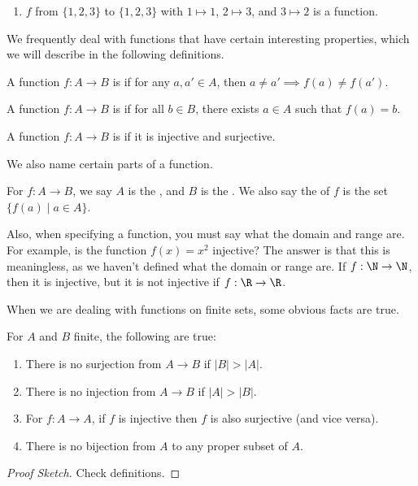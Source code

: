 \begin{example}
\begin{enumerate}[label=(\roman*)]
\begin{center}
\begin{tikzpicture}[x=0.75pt,y=0.75pt,yscale=-1,xscale=1]
\end{tikzpicture}

		\end{center}
		is a function.
	
	\item $f$ from $\{1, 2, 3\}$ to $\{1, 2, 3\}$ with $1 \mapsto 1$, $2 \mapsto 3$, and $3 \mapsto 2$ is a function.
\end{enumerate}
\end{example}

We frequently deal with functions that have certain interesting properties, which we will describe in the following definitions.

\begin{definition}[Injectivity]
	A function $f: A \rightarrow B$ is  if for any $a, a' \in A$, then $a \neq a' \implies f(a) \neq f(a')$.
\end{definition}
\begin{definition}[Surjectivity]
	A function $f : A \rightarrow B$ is  if for all $b \in B$, there exists $a \in A$ such that $f(a) = b$.
\end{definition}
\begin{definition}[Bijectivity]
	A function $f: A \rightarrow B$ is  if it is injective and surjective.
\end{definition}

We also name certain parts of a function.
\begin{definition}
	For $f: A \rightarrow B$, we say $A$ is the , and $B$ is the . We also say the  of $f$ is the set $\{f(a) \mid a \in A\}$.
\end{definition}
Also, when specifying a function, you must say what the domain and range are. For example, is the function $f(x) = x^2$ injective? The answer is that this is meaningless, as we haven't defined what the domain or range are. If $f : \N \rightarrow \N$, then it is injective, but it is not injective if $f: \R \rightarrow \R$.

When we are dealing with functions on finite sets, some obvious facts are true.
\begin{proposition}
	For $A$ and $B$ finite, the following are true:
	\begin{enumerate}[label=(\roman*)]
		\item There is no surjection from $A \rightarrow B$ if $|B| > |A|$.
		\item There is no injection from $A \rightarrow B$ if $|A| > |B|$.
		\item For $f: A \rightarrow A$, if $f$ is injective then $f$ is also surjective (and vice versa).
		\item There is no bijection from $A$ to any proper subset of $A$.
	\end{enumerate}
\end{proposition}
\begin{proof}[Proof Sketch]
	Check definitions.
\end{proof}

